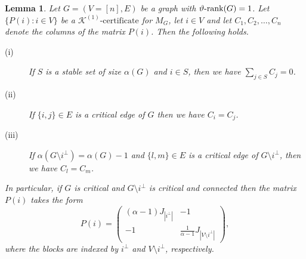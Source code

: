 \documentclass[11pt]{article}
\newtheorem{lemma}[theorem]{Lemma}
\newcommand{\konec}{\MK^{(1)}\text{-certificate}}
\numberwithin{equation}{section}
\newcommand{\MK}{{\mathcal K}}
\newcommand{\rrank}{\vartheta\text{\rm -rank}}
\newcommand{\MoL}{\textcolor{red}}
\begin{document}
\begin{lemma}\label{structure-P}
Let $G=(V=[n],E)$ be a graph with  $\rrank(G)=1$. Let $\{P(i): i\in V\}$ be a $\konec$ for $M_G$, let $i\in V$  and let $C_1, C_2, \dots, C_n$ denote the columns of the matrix $P(i)$. Then the following holds.
	\begin{description}
		\item[(i)]   If $S$ is a stable set of size $\alpha(G)$ and $i\in S$,  then we have $\sum_{j\in S}C_j=0$.
		\item[(ii)] If $\{i,j\}\in E$ is a critical edge of $G$ then we have $C_i=C_j$. 
		\item[(iii)] If $\alpha(G\setminus i^{\perp})=\alpha(G)-1$ and $\{l,m\}\in E$ is a critical edge of $G\setminus i^{\perp}$, then we have $C_l=C_m$.
	\end{description} 
In particular, if  $G$ is critical and $G\setminus i^{\perp}$ is critical and connected then the matrix $P(i)$ takes the form 
\begin{equation}\label{P-form}
P(i)=\left(
\begin{array}{c|c}
(\alpha-1)J_{|i^\perp|}& -1\\
\hline
-1 & \frac{1}{\alpha-1}J_{|V\setminus i^\perp|}
\end{array}
\right),
\end{equation}
where the blocks are indexed by $i^{\perp}$ and $V\setminus i^\perp$, respectively. 
\end{lemma}
\end{document}
